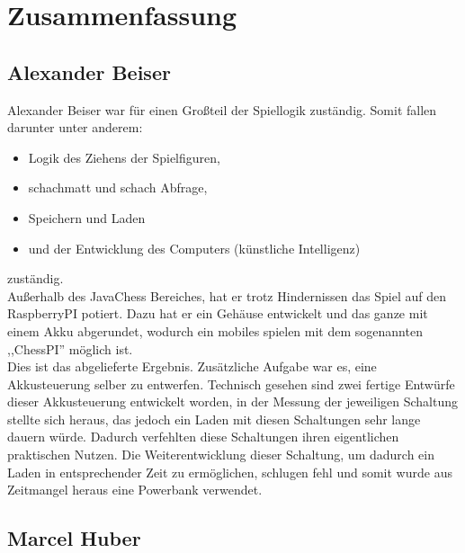 \documentclass[12pt,a4paper]{article}
\newcommand{\cmnt}[1]{}			%
\begin{document}
{\cmnt{

\clearpage\vfill\newpage
	\vfill
	{\color{white} NIX}

}


\clearpage\vfill\newpage
\section{\sc Zusammenfassung}

\subsection{Alexander Beiser}

Alexander Beiser war für einen Großteil der Spiellogik zuständig. Somit fallen darunter unter anderem:
\begin{itemize}
	\item{Logik des Ziehens der Spielfiguren,}
	\item{schachmatt und schach Abfrage,}
	\item{Speichern und Laden}
	\item{und der Entwicklung des Computers (künstliche Intelligenz)}
\end{itemize}
zuständig. \\
Außerhalb des JavaChess Bereiches, hat er trotz Hindernissen das Spiel auf den RaspberryPI potiert. Dazu hat er ein Gehäuse entwickelt und das ganze mit einem Akku abgerundet, wodurch ein mobiles spielen mit dem sogenannten ,,ChessPI'' möglich ist. \\
Dies ist das abgelieferte Ergebnis. Zusätzliche Aufgabe war es, eine Akkusteuerung selber zu entwerfen. Technisch gesehen sind zwei fertige Entwürfe dieser Akkusteuerung entwickelt worden, in der Messung der jeweiligen Schaltung stellte sich heraus, das jedoch ein Laden mit diesen Schaltungen sehr lange dauern würde. Dadurch verfehlten diese Schaltungen ihren eigentlichen praktischen Nutzen. Die Weiterentwicklung dieser Schaltung, um dadurch ein Laden in entsprechender Zeit zu ermöglichen, schlugen fehl und somit wurde aus Zeitmangel heraus eine Powerbank verwendet.

\newpage
\subsection{Marcel Huber}

}
\end{document}
